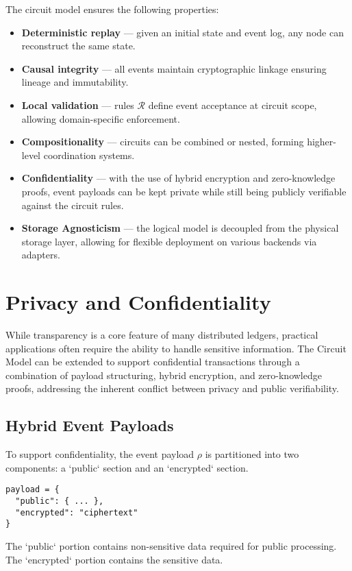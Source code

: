 \documentclass{article}
\begin{document}
The circuit model ensures the following properties:
\begin{itemize}
    \item \textbf{Deterministic replay} — given an initial state and event log, any node can reconstruct the same state.
    \item \textbf{Causal integrity} — all events maintain cryptographic linkage ensuring lineage and immutability.
    \item \textbf{Local validation} — rules $\mathcal{R}$ define event acceptance at circuit scope, allowing domain-specific enforcement.
    \item \textbf{Compositionality} — circuits can be combined or nested, forming higher-level coordination systems.
    \item \textbf{Confidentiality} — with the use of hybrid encryption and zero-knowledge proofs, event payloads can be kept private while still being publicly verifiable against the circuit rules.
    \item \textbf{Storage Agnosticism} — the logical model is decoupled from the physical storage layer, allowing for flexible deployment on various backends via adapters.
\end{itemize}

\section{Privacy and Confidentiality}

While transparency is a core feature of many distributed ledgers, practical applications often require the ability to handle sensitive information. The Circuit Model can be extended to support confidential transactions through a combination of payload structuring, hybrid encryption, and zero-knowledge proofs, addressing the inherent conflict between privacy and public verifiability.

\subsection{Hybrid Event Payloads}
To support confidentiality, the event payload $\rho$ is partitioned into two components: a `public` section and an `encrypted` section.
\begin{verbatim}
payload = {
  "public": { ... },
  "encrypted": "ciphertext"
}
\end{verbatim}
The `public` portion contains non-sensitive data required for public processing. The `encrypted` portion contains the sensitive data.
\end{document}
